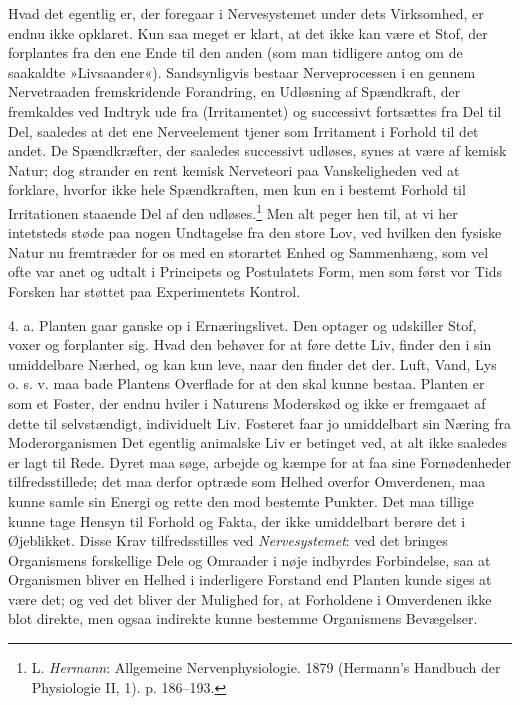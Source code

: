 \documentclass[12pt,a4paper,openany]{book}
\newcommand{\opage}[1]{\marginnote{\footnotesize\textit{[#1]}}}
\begin{document}
Hvad det egentlig er, der foregaar i Nervesystemet under dets
Virksomhed, er endnu ikke opklaret. Kun saa meget er klart, at det ikke
kan være et Stof, der forplantes fra den ene Ende til den anden (som man
tidligere antog om de saakaldte »Livsaander«). Sandsynligvis bestaar
Nerveprocessen i en gennem Nervetraaden fremskridende Forandring, en
Udløsning af Spændkraft, der fremkaldes ved Indtryk ude fra
(Irritamentet) og successivt fortsættes fra Del til Del, saaledes at det
ene Nerveelement tjener som Irritament i Forhold til det andet. De
Spændkræfter, der saaledes successivt udløses, synes at være af kemisk
Natur; dog strander en rent kemisk Nerveteori paa Vanskeligheden ved at
forklare, hvorfor ikke hele Spændkraften, men kun en i bestemt Forhold
til Irritationen staaende Del af den udløses.\footnote[1]{L.
\emph{Hermann}: Allgemeine Nervenphysiologie. 1879 (Hermann’s Handbuch
der Physiologie II, 1). p. 186--193.} Men alt peger hen til, at vi her
intetsteds støde paa nogen Undtagelse fra den store Lov, ved hvilken den
fysiske Natur nu fremtræder for os med en storartet Enhed og Sammenhæng,
som vel ofte var anet og udtalt i Principets og Postulatets Form, men
som først vor Tids Forsken har støttet paa Experimentets Kontrol.

4. a. Planten gaar ganske op i Ernæringslivet. Den optager og udskiller
Stof, voxer og forplanter sig. Hvad den behøver for at føre dette Liv,
finder den i sin umiddelbare Nærhed, og kan kun leve, naar den finder
det der. Luft, Vand, Lys o. s. v. maa bade Plantens Overflade for at den
skal kunne bestaa. Planten er som et Foster, der endnu hviler i Naturens
Moderskød og ikke er fremgaaet af dette til selvstændigt, individuelt
Liv. Fosteret faar jo umiddelbart sin
\opage{45}Næring fra Moderorganismen Det egentlig animalske Liv er
betinget ved, at alt ikke saaledes er lagt til Rede. Dyret maa søge,
arbejde og kæmpe for at faa sine Fornødenheder tilfredsstillede; det maa
derfor optræde som Helhed overfor Omverdenen, maa kunne samle sin Energi
og rette den mod bestemte Punkter. Det maa tillige kunne tage Hensyn til
Forhold og Fakta, der ikke umiddelbart berøre det i Øjeblikket. Disse
Krav tilfredsstilles ved \emph{Nervesystemet}: ved det bringes
Organismens forskellige Dele og Omraader i nøje indbyrdes Forbindelse,
saa at Organismen bliver en Helhed i inderligere Forstand end Planten
kunde siges at være det; og ved det bliver der Mulighed for, at
Forholdene i Omverdenen ikke blot direkte, men ogsaa indirekte kunne
bestemme Organismens Bevægelser.
\end{document}
